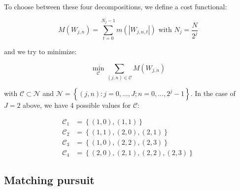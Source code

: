 \documentclass[workdone.tex]{subfiles}
\begin{document}
To choose between these four decompositions, we define a cost functional:

\begin{equation}
M \left( W_{j,n} \right) = \sum_{t = 0}^{N_j - 1} m \left( \left\vert W_{j,n,t} \right\vert \right) \text{ with } N_j = \frac{N}{2^j}
\end{equation}

and we try to minimize:

\begin{equation}
\min_{\mathcal{C}} \sum_{\left( j,n \right) \in \mathcal{C}} M \left( W_{j,n} \right)
\end{equation}

with $\mathcal{C} \subset \mathcal{N}$ and $\mathcal{N} = \left\{ \left( j,n \right) : j = 0 , ... , J ; n = 0 , ... , 2^j - 1 \right\}$. In the case of $J = 2$ above, we have 4 possible values for $\mathcal{C}$:

\begin{align*}
\mathcal{C}_1 &= \left\{ \left( 1,0 \right) , \left( 1,1 \right) \right\} \\
\mathcal{C}_2 &= \left\{ \left( 1,1 \right) , \left( 2,0 \right) , \left( 2,1 \right) \right\} \\
\mathcal{C}_3 &= \left\{ \left( 1,0 \right) , \left( 2,2 \right) , \left( 2,3 \right) \right\} \\
\mathcal{C}_4 &= \left\{ \left( 2,0 \right) , \left( 2,1 \right) , \left( 2,2 \right) , \left( 2,3 \right) \right\}
\end{align*}

\subsection{Matching pursuit}
\end{document}
